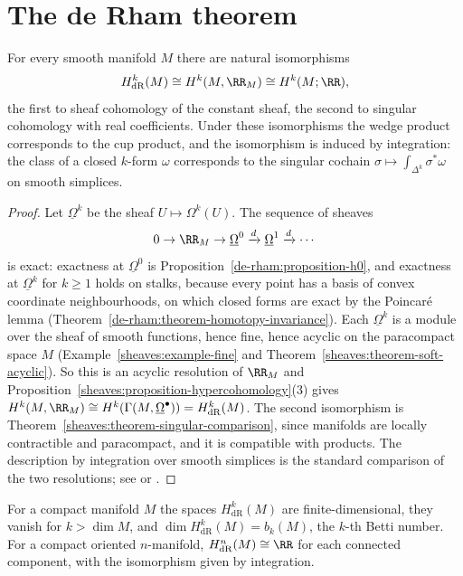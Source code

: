 \section{The de Rham theorem}\label{de-rham:section-de-rham-theorem}

\begin{theorem}[de Rham]\label{de-rham:theorem-de-rham}
For every smooth manifold $M$ there are natural isomorphisms
\[
H^k_{\mathrm{dR}}(M) \cong H^k(M, \RR_M) \cong H^k(M; \RR),
\]
the first to sheaf cohomology of the constant sheaf, the second to singular cohomology with real coefficients. Under these isomorphisms the wedge product corresponds to the cup product, and the
isomorphism is induced by integration: the class of a closed $k$-form $\omega$ corresponds to the singular cochain $\sigma \mapsto \int_{\Delta^k}\sigma^*\omega$ on smooth simplices.
\end{theorem}

\begin{proof}
Let $\underline{\Omega}^k$ be the sheaf $U \mapsto \Omega^k(U)$. The sequence of sheaves
\[
0 \to \RR_M \to \underline{\Omega}^0 \xrightarrow{d} \underline{\Omega}^1 \xrightarrow{d} \cdots
\]
is exact: exactness at $\underline{\Omega}^0$ is Proposition~\ref{de-rham:proposition-h0}, and exactness at $\underline{\Omega}^k$ for $k \geq 1$ holds on stalks, because every point has a basis of convex
coordinate neighbourhoods, on which closed forms are exact by the Poincar\'e lemma (Theorem~\ref{de-rham:theorem-homotopy-invariance}). Each $\underline{\Omega}^k$ is a module over the sheaf of smooth
functions, hence fine, hence acyclic on the paracompact space $M$ (Example~\ref{sheaves:example-fine} and
Theorem~\ref{sheaves:theorem-soft-acyclic}). So this is an acyclic resolution of $\RR_M$ and
Proposition~\ref{sheaves:proposition-hypercohomology}(3) gives $H^k(M, \RR_M) \cong H^k(\Gamma(M, \underline{\Omega}^\bullet)) = H^k_{\mathrm{dR}}(M)$. The second isomorphism is
Theorem~\ref{sheaves:theorem-singular-comparison}, since manifolds are locally contractible and paracompact, and it is compatible with products. The description by integration over smooth simplices
is the standard comparison of the two resolutions; see \cite[Chapter 5]{warner-foundations} or \cite[Chapter III]{bredon-sheaf}.
\end{proof}

\begin{corollary}\label{de-rham:corollary-consequences}
For a compact manifold $M$ the spaces $H^k_{\mathrm{dR}}(M)$ are finite-dimensional, they vanish for $k > \dim M$, and $\dim H^k_{\mathrm{dR}}(M) = b_k(M)$, the $k$-th Betti number. For a compact oriented
$n$-manifold, $H^n_{\mathrm{dR}}(M) \cong \RR$ for each connected component, with the isomorphism given by integration.
\end{corollary}

